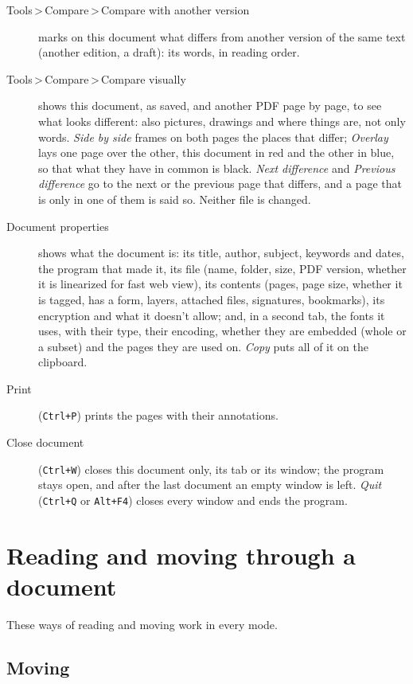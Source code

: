 \documentclass[12pt,
              article,
              oneside
              ]{memoir}
\newcommand*{\menu}[1]{\textit{#1}}
\newcommand*{\then}{\,>\,}
\newcommand*{\key}[1]{\texttt{#1}}
\begin{document}
%
\begin{description}
\item[Tools\then Compare\then Compare with another version] marks on this document
  what differs from another version of the same text (another edition, a
  draft): its words, in reading order.
\item[Tools\then Compare\then Compare visually] shows this document, as saved, and
  another PDF page by page, to see what looks different: also pictures,
  drawings and where things are, not only words. \menu{Side by side} frames
  on both pages the places that differ; \menu{Overlay} lays one page over
  the other, this document in red and the other in blue, so that what they
  have in common is black. \menu{Next difference} and \menu{Previous
  difference} go to the next or the previous page that differs, and a page
  that is only in one of them is said so. Neither file is changed.
\item[Document properties] shows what the document is: its title, author,
  subject, keywords and dates, the program that made it, its file (name,
  folder, size, PDF version, whether it is linearized for fast web view),
  its contents (pages, page size, whether it is tagged, has a form, layers,
  attached files, signatures, bookmarks), its encryption and what it
  doesn't allow; and, in a second tab, the fonts it uses, with their type,
  their encoding, whether they are embedded (whole or a subset) and the
  pages they are used on. \menu{Copy} puts all of it on the clipboard.
\item[Print] (\key{Ctrl+P}) prints the pages with their annotations.
\item[Close document] (\key{Ctrl+W}) closes this document only, its tab
  or its window; the program stays open, and after the last document an
  empty window is left. \textup{\textit{Quit}} (\key{Ctrl+Q} or
  \key{Alt+F4}) closes every window and ends the program.
\end{description}

\section{Reading and moving through a document}
\label{sec:reading}

%
These ways of reading and moving work in every mode.

\subsection{Moving}
\end{document}
